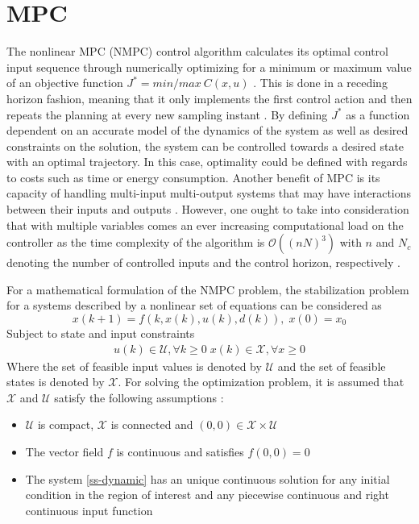 \section{MPC}
\label{nonlinMPC}
The nonlinear MPC (NMPC) control algorithm calculates its optimal control input sequence through numerically optimizing for a minimum or maximum value of an objective function $J^{*}=min/max\:C(x,u)$ \cite{MPCdimitry}. This is done in a receding horizon fashion, meaning that it only implements the first control action and then repeats the planning at every new sampling instant \cite{MPCbook}. By defining $J^{*}$ as a function dependent on an accurate model of the dynamics of the system as well as desired constraints on the solution, the system can be controlled towards a desired state with an optimal trajectory. In this case, optimality could be defined with regards to costs such as time or energy consumption. Another benefit of MPC is its capacity of handling multi-input multi-output systems that may have interactions between their inputs and outputs \cite{MatlabMPC}. However, one ought to take into consideration that with multiple variables comes an ever increasing computational load on the controller as the time complexity of the algorithm is $\mathcal{O}((nN)^{3})$ with $n$ and $N_c$ denoting the number of controlled inputs and the control horizon, respectively \cite{li2011application}.\newline

\noindent For a mathematical formulation of the NMPC problem, the stabilization problem for a systems described by a nonlinear set of
equations can be considered as
\begin{equation}
\label{ss-dynamic}
    x(k+1) = f(k, x(k), u(k), d(k)),\; x(0) = x_{0}
\end{equation}
Subject to state and input constraints
\begin{align}
     u(k) \in \mathcal{U}, \forall k\geq0 \; x(k) \in \mathcal{X}, \forall x \geq 0
\end{align}
Where the set of feasible input values is denoted by $\mathcal{U}$ and the set of feasible states is denoted by $\mathcal{X}$. For solving the optimization problem, it is assumed that $\mathcal{X}$ and $\mathcal{U}$ satisfy the following assumptions \cite{findeisen2002introduction}:
\begin{itemize}
    \item $\mathcal{U}$ is compact, $\mathcal{X}$ is connected and $(0,0)\in\mathcal{X}\times \mathcal{U}$
    \item The vector field $f$ is continuous and satisfies $f(0,0) = 0$
    \item The system \ref{ss-dynamic} has an unique continuous solution for any initial condition in the region of interest and any piecewise continuous and right continuous input function
\end{itemize}

